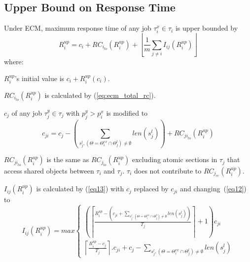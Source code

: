 \subsection{Upper Bound on Response Time}
%
\begin{clm}\label{clm:ecm_response_time_upper_bound}
%
Under ECM, maximum response time of any job $\tau_i^x \in \tau_i$ is upper bounded by 
%
\begin{equation}
R_{i}^{up}=c_{i}+RC_{i_{to}}(R_i^{up})+\left\lfloor\frac{1}{m}\sum_{j\ne i}I_{ij}(R_{i}^{up})\right\rfloor
\label{eq10}
\end{equation}
%
where:
\begin{compactitem}
\item $R_{i}^{up}$'s initial value is $c_i + R_i^{up}(c_i)$.
\item $RC_{i_{to}}(R_i^{up})$ is calculated by (\ref{eq:ecm_total_rc}).
\item $c_j$ of any job $\tau_j^y \in \tau_j$ with $p_j^y > p_i^x$ is modified to 
\begin{equation}
c_{ji}=c_{j}-\left(\sum_{s_j^l,\left(\Theta=\Theta_i^{ex} \cap \Theta_j^l\right)\neq \emptyset}len \left(s_j^l \right) \right)+RC_{{ji}_{to}}(R_i^{up})\label{eq9}\end{equation}
\item $RC_{{ji}_{to}}(R_i^{up})$ is the same as $RC_{j_{to}}(R_i^{up})$ excluding atomic sections in $\tau_j$ that access shared objects between $\tau_i$ and $\tau_j$. $\tau_i$ does not contribute to $RC_{j_{re}}(R_i^{up})$.
\item $I_{ij}(R_{i}^{up})$ is calculated by (\ref{eq13}) with $c_{j}$ replaced by 
$c_{ji}$ and changing~(\ref{eq12}) to 
\begin{equation}
I_{ij}(R_i^{up})=max\begin{cases}
\left(\left\lceil\frac{R_i^{up}-\left(c_{ji}+\sum_{s_j^l,\left(\Theta=\Theta_i^{ex} \cap \Theta_j^l\right)\neq \emptyset} len(s_j^l)\right)}{T_{j}}\right\rceil+1 \right)c_{ji}\\
\left\lceil\frac{R_i^{up}-c_{j}}{T_{j}}\right\rceil.c_{ji}+c_{j}-\sum_{s_j^l,\left(\Theta=\Theta_i^{ex} \cap \Theta_j^l\right)\neq \emptyset} {len(s_j^l)}\end{cases}\label{eq14}\end{equation}
\end{compactitem}
%
\end{clm}
%
